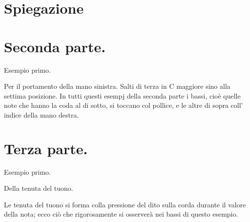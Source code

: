 \documentclass[a4paper]{article}
\begin{document}
\section*{Spiegazione}

\section*{Seconda parte.}

Esempio primo.

Per il portamento della mano sinistra.  Salti di terza in C maggiore sino alla settima posizione.  In tutti questi esempj della seconda parte i bassi, cioè quelle note che hanno la coda al di sotto, si toccano col pollice, e le altre di sopra coll' indice della mano destra.

\section*{Terza parte.}

Esempio primo.

Della tenuta del tuono.

Le tenuta del tuono si forma colla pressione del dito sulla corda durante il valore della nota; ecco ciò che rigorosamente si osserverà nei bassi di questo esempio.
\end{document}
